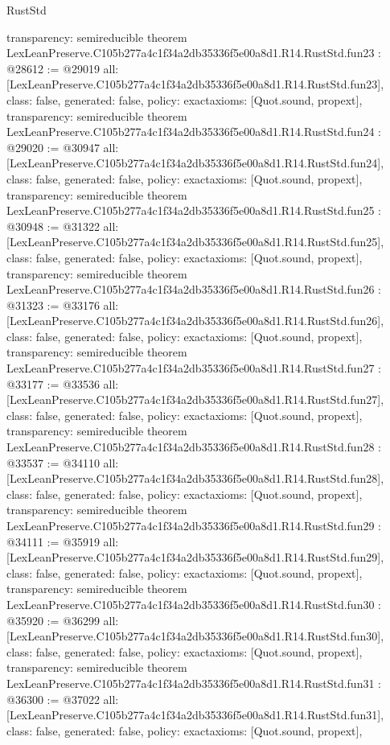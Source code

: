 \begin{lexlean}{RustStd}
\begin{coremodule}
{  transparency: semireducible
}
theorem LexLeanPreserve.C105b277a4c1f34a2db35336f5e00a8d1.R14.RustStd.fun23 : @28612 := @29019 {
  all: [LexLeanPreserve.C105b277a4c1f34a2db35336f5e00a8d1.R14.RustStd.fun23],
  class: false,
  generated: false,
  policy: exact{axioms: [Quot.sound, propext]},
  transparency: semireducible
}
theorem LexLeanPreserve.C105b277a4c1f34a2db35336f5e00a8d1.R14.RustStd.fun24 : @29020 := @30947 {
  all: [LexLeanPreserve.C105b277a4c1f34a2db35336f5e00a8d1.R14.RustStd.fun24],
  class: false,
  generated: false,
  policy: exact{axioms: [Quot.sound, propext]},
  transparency: semireducible
}
theorem LexLeanPreserve.C105b277a4c1f34a2db35336f5e00a8d1.R14.RustStd.fun25 : @30948 := @31322 {
  all: [LexLeanPreserve.C105b277a4c1f34a2db35336f5e00a8d1.R14.RustStd.fun25],
  class: false,
  generated: false,
  policy: exact{axioms: [Quot.sound, propext]},
  transparency: semireducible
}
theorem LexLeanPreserve.C105b277a4c1f34a2db35336f5e00a8d1.R14.RustStd.fun26 : @31323 := @33176 {
  all: [LexLeanPreserve.C105b277a4c1f34a2db35336f5e00a8d1.R14.RustStd.fun26],
  class: false,
  generated: false,
  policy: exact{axioms: [Quot.sound, propext]},
  transparency: semireducible
}
theorem LexLeanPreserve.C105b277a4c1f34a2db35336f5e00a8d1.R14.RustStd.fun27 : @33177 := @33536 {
  all: [LexLeanPreserve.C105b277a4c1f34a2db35336f5e00a8d1.R14.RustStd.fun27],
  class: false,
  generated: false,
  policy: exact{axioms: [Quot.sound, propext]},
  transparency: semireducible
}
theorem LexLeanPreserve.C105b277a4c1f34a2db35336f5e00a8d1.R14.RustStd.fun28 : @33537 := @34110 {
  all: [LexLeanPreserve.C105b277a4c1f34a2db35336f5e00a8d1.R14.RustStd.fun28],
  class: false,
  generated: false,
  policy: exact{axioms: [Quot.sound, propext]},
  transparency: semireducible
}
theorem LexLeanPreserve.C105b277a4c1f34a2db35336f5e00a8d1.R14.RustStd.fun29 : @34111 := @35919 {
  all: [LexLeanPreserve.C105b277a4c1f34a2db35336f5e00a8d1.R14.RustStd.fun29],
  class: false,
  generated: false,
  policy: exact{axioms: [Quot.sound, propext]},
  transparency: semireducible
}
theorem LexLeanPreserve.C105b277a4c1f34a2db35336f5e00a8d1.R14.RustStd.fun30 : @35920 := @36299 {
  all: [LexLeanPreserve.C105b277a4c1f34a2db35336f5e00a8d1.R14.RustStd.fun30],
  class: false,
  generated: false,
  policy: exact{axioms: [Quot.sound, propext]},
  transparency: semireducible
}
theorem LexLeanPreserve.C105b277a4c1f34a2db35336f5e00a8d1.R14.RustStd.fun31 : @36300 := @37022 {
  all: [LexLeanPreserve.C105b277a4c1f34a2db35336f5e00a8d1.R14.RustStd.fun31],
  class: false,
  generated: false,
  policy: exact{axioms: [Quot.sound, propext]},
}
\end{coremodule}
\end{lexlean}
